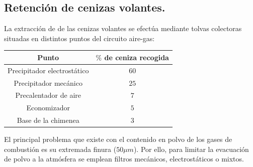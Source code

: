 \subsection{Retención de cenizas volantes.}
La extracción de de las cenizas volantes se efectúa mediante tolvas colectoras situadas en distintos puntos del circuito aire-gas:
\begin{table}[H]
	\centering
	\renewcommand{\arraystretch}{1.5}
	\begin{tabular}{|c|c|}
		\hline
		Punto&$\%$ de ceniza recogida\\
		\hline
		Precipitador electrostático&$60$\\
		\hline
		Precipitador mecánico&$25$\\
		\hline
		Precalentador de aire&$7$\\
		\hline
		Economizador&$5$\\
		\hline
		Base de la chimenea&$3$\\
		\hline
	\end{tabular}
\end{table}


El principal problema que existe con el contenido en polvo de los gases de combustión es su extremada finura ($50\mu m$). Por ello, para limitar la evacuación de polvo a la atmósfera se emplean filtros mecánicos, electrostáticos o mixtos.
